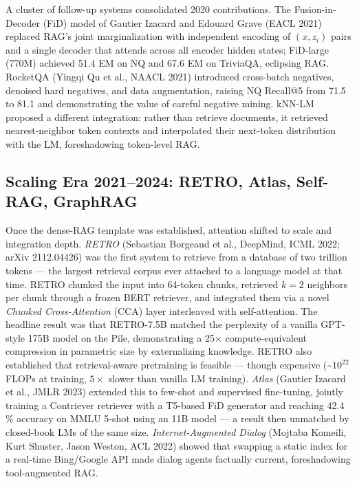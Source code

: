 \documentclass{article}
\begin{document}
A cluster of follow-up systems consolidated 2020 contributions. The Fusion-in-Decoder (FiD) model of Gautier Izacard and Edouard Grave (EACL 2021) replaced RAG's joint marginalization with independent encoding of \((x, z_i)\) pairs and a single decoder that attends across all encoder hidden states; FiD-large (770M) achieved 51.4 EM on NQ and 67.6 EM on TriviaQA, eclipsing RAG. RocketQA (Yingqi Qu et al., NAACL 2021) introduced cross-batch negatives, denoised hard negatives, and data augmentation, raising NQ Recall@5 from 71.5 to 81.1 and demonstrating the value of careful negative mining. kNN-LM \citep{khandelwal2020generalizationthro} proposed a different integration: rather than retrieve documents, it retrieved nearest-neighbor token contexts and interpolated their next-token distribution with the LM, foreshadowing token-level RAG.

\subsection{Scaling Era 2021--2024: RETRO, Atlas, Self-RAG, GraphRAG}\label{scaling-era-20212024-retro-atlas-self-rag-graphrag}

Once the dense-RAG template was established, attention shifted to scale and integration depth. \emph{RETRO} (Sebastian Borgeaud et al., DeepMind, ICML 2022; arXiv 2112.04426) was the first system to retrieve from a database of two trillion tokens --- the largest retrieval corpus ever attached to a language model at that time. RETRO chunked the input into 64-token chunks, retrieved \(k=2\) neighbors per chunk through a frozen BERT retriever, and integrated them via a novel \emph{Chunked Cross-Attention} (CCA) layer interleaved with self-attention. The headline result was that RETRO-7.5B matched the perplexity of a vanilla GPT-style 175B model on the Pile, demonstrating a 25× compute-equivalent compression in parametric size by externalizing knowledge. RETRO also established that retrieval-aware pretraining is feasible --- though expensive (\textasciitilde{}\(10^{22}\) FLOPs at training, \(5\times\) slower than vanilla LM training). \emph{Atlas} (Gautier Izacard et al., JMLR 2023) extended this to few-shot and supervised fine-tuning, jointly training a Contriever retriever with a T5-based FiD generator and reaching 42.4 \% accuracy on MMLU 5-shot using an 11B model --- a result then unmatched by closed-book LMs of the same size. \emph{Internet-Augmented Dialog} (Mojtaba Komeili, Kurt Shuster, Jason Weston, ACL 2022) showed that swapping a static index for a real-time Bing/Google API made dialog agents factually current, foreshadowing tool-augmented RAG.
\end{document}
